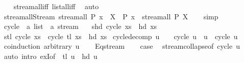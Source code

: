 \begin{isabellebody}
%
\isadelimproof
\ \ %
\endisadelimproof
%
\isatagproof
{}\isamarkupfalse%
\ stream{\isacharunderscore}all{\isacharunderscore}iff\ list{\isacharunderscore}all{\isacharunderscore}iff\ \isamarkupfalse%
\ auto%
\endisatagproof
{\isafoldproof}%
%
\isadelimproof
\isanewline
%
\endisadelimproof
\isanewline
{}\isamarkupfalse%
\ stream{\isacharunderscore}all{\isacharunderscore}Stream{\isacharcolon}\ {\isachardoublequoteopen}stream{\isacharunderscore}all\ P\ {\isacharparenleft}x\ {\isacharhash}{\isacharhash}\ X{\isacharparenright}\ {\isasymlongleftrightarrow}\ P\ x\ {\isasymand}\ stream{\isacharunderscore}all\ P\ X{\isachardoublequoteclose}\isanewline
%
\isadelimproof
\ \ %
\endisadelimproof
%
\isatagproof
{}\isamarkupfalse%
\ simp%
\endisatagproof
{\isafoldproof}%
%
\isadelimproof
%
\endisadelimproof
%
\isadelimdocument
%
\endisadelimdocument
%
\isatagdocument
%
\isamarkuptrue%
%
\endisatagdocument
{\isafolddocument}%
%
\isadelimdocument
%
\endisadelimdocument
{}\isamarkupfalse%
\ cycle\ {\isacharcolon}{\isacharcolon}\ {\isachardoublequoteopen}{\isacharprime}a\ list\ {\isasymRightarrow}\ {\isacharprime}a\ stream{\isachardoublequoteclose}\ \isanewline
\ \ {\isachardoublequoteopen}shd\ {\isacharparenleft}cycle\ xs{\isacharparenright}\ {\isacharequal}\ hd\ xs{\isachardoublequoteclose}\isanewline
{\isacharbar}\ {\isachardoublequoteopen}stl\ {\isacharparenleft}cycle\ xs{\isacharparenright}\ {\isacharequal}\ cycle\ {\isacharparenleft}tl\ xs\ {\isacharat}\ {\isacharbrackleft}hd\ xs{\isacharbrackright}{\isacharparenright}{\isachardoublequoteclose}\isanewline
\isanewline
{}\isamarkupfalse%
\ cycle{\isacharunderscore}decomp{\isacharcolon}\ {\isachardoublequoteopen}u\ {\isasymnoteq}\ {\isacharbrackleft}{\isacharbrackright}\ {\isasymLongrightarrow}\ cycle\ u\ {\isacharequal}\ u\ {\isacharat}{\isacharminus}\ cycle\ u{\isachardoublequoteclose}\isanewline
%
\isadelimproof
%
\endisadelimproof
%
\isatagproof
{}\isamarkupfalse%
\ {\isacharparenleft}coinduction\ arbitrary{\isacharcolon}\ u{\isacharparenright}\isanewline
\ \ \isamarkupfalse%
\ Eq{\isacharunderscore}stream\ \isamarkupfalse%
\ \isamarkupfalse%
\ {\isacharquery}case\ \isamarkupfalse%
\ stream{\isachardot}collapse{\isacharbrackleft}of\ {\isachardoublequoteopen}cycle\ u{\isachardoublequoteclose}{\isacharbrackright}\isanewline
\ \ \ \ \isamarkupfalse%
\ {\isacharparenleft}auto\ intro{\isacharbang}{\isacharcolon}\ exI{\isacharbrackleft}of\ {\isacharunderscore}\ {\isachardoublequoteopen}tl\ u\ {\isacharat}\ {\isacharbrackleft}hd\ u{\isacharbrackright}{\isachardoublequoteclose}{\isacharbrackright}{\isacharparenright}\isanewline

\end{isabellebody}
